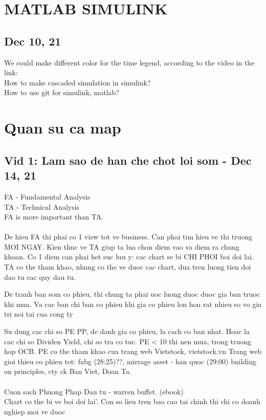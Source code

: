 \documentclass{article}
\begin{document}

\section{MATLAB SIMULINK}

\subsection{Dec 10, 21}

We could make different color for the time legend, 
according to the video in the link: 
\\

How to make cascaded simulation in simulink?\\

How to use git for simulink, matlab?



\section{Quan su ca map}

\subsection{Vid 1: Lam sao de han che chot loi som - Dec 14, 21}
FA - Fundamental Analysis
\\TA - Technical Analysis
\\FA is more important than TA.\\
\\De hieu FA thi phai co 1 view tot ve business. Can phai tim hieu ve thi truong MOI NGAY.
Kien thuc ve TA giup ta lua chon diem vao va diem ra chung khoan.
Co 1 diem can phai het suc luu y: cac chart se bi CHI PHOI boi doi lai.
TA co the tham khao, nhung co the ve duoc cac chart, dua tren luong tien doi dao 
tu cac quy dau tu.


De tranh ban som co phieu, thi chung ta phai uoc luong duoc duoc gia ban truoc khi mua.
Va cac ban chi ban co phieu khi gia co phieu lon hon rat nhieu so vo
gia tri noi tai cua cong ty

Su dung cac chi so PE PP, de danh gia co phieu, la cach co ban nhat.
Hoac la cac chi so Dividen Yield, chi so tra co tuc.
PE < 10 thi nen mua, trong truong hop OCB.
PE co the tham khao cua trang web Vietstock, vietstock.vn
Trang web gioi thieu co phieu tot: fabg (28:25)??, 
mirrage asset - han quoc (29:00) building on principles, cty ck Ban Viet, Doan Ta.\\
\\Cuon sach Phuong Phap Dau tu - warren buffet. (ebook)
\\Chart co the bi ve boi doi lai'. Con so lieu tren bao cao tai chinh thi chi co doanh nghiep
moi ve duoc
\end{document}
